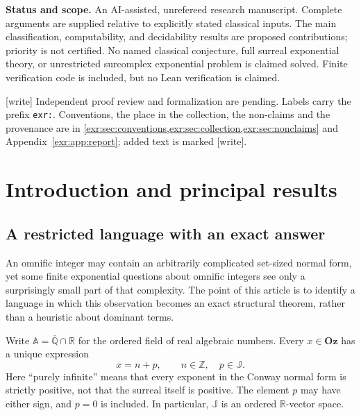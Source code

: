 \documentclass[11pt,letterpaper]{article}
\numberwithin{equation}{section}
\theoremstyle{definition}
\theoremstyle{remark}
\newcommand{\Oz}{\mathbf{Oz}}
\newcommand{\Z}{\mathbb Z}
\newcommand{\R}{\mathbb R}
\newcommand{\A}{\mathbb A}
\newcommand{\Qb}{\overline{\mathbb Q}}
\newcommand{\J}{\mathbb J}
\newcommand{\wtag}{\textup{[write]}}%
\begin{document}
\begin{titlepage}
\begin{minipage}{0.92\textwidth}
\begin{abstract}
We also prove a rectangular normal form for definable sets, finite-image results
for maps between the two components, and an undecidability boundary obtained by
adjoining the single nonlinear relation $\exp(xy)=\exp(z)$. Additional results
classify certain exponential equations with arbitrary positive real bases by
ordinary integer fibers and purely infinite linear families. With just one
irrational scalar-graph predicate, we prove that the theory has exactly the Turing
degree of the rational cut of its slope.
\end{abstract}
\end{minipage}
\vfill
\begin{minipage}{0.92\textwidth}\small
\textbf{Status and scope.} An AI-assisted, unrefereed research manuscript. Complete
arguments are supplied relative to explicitly stated classical inputs. The main
classification, computability, and decidability results are proposed contributions; priority is
not certified. No named classical conjecture, full surreal exponential theory,
or unrestricted surcomplex exponential problem is claimed solved. Finite
verification code is included, but no Lean verification is claimed.

\wtag{} Independent proof review and formalization are pending. Labels
carry the prefix \texttt{exr:}. Conventions, the place in the collection,
the non-claims and the provenance are in
\cref{exr:sec:conventions,exr:sec:collection,exr:sec:nonclaims} and
Appendix~\ref{exr:app:report}; added text is marked \wtag.
\end{minipage}
\end{titlepage}
\hypersetup{pageanchor=true}
\tableofcontents
\clearpage
\section{Introduction and principal results}\label{exr:sec:intro}
\subsection{A restricted language with an exact answer}
An omnific integer may contain an arbitrarily complicated set-sized normal form,
yet some finite exponential questions about omnific integers see only a surprisingly
small part of that complexity. The point of this article is to identify a language
in which this observation becomes an exact structural theorem, rather than a
heuristic about dominant terms.

Write $\A=\Qb\cap\R$ for the ordered field of real algebraic numbers. Every
$x\in\Oz$ has a unique expression
\begin{equation}\label{exr:eq:introsplit}
 x=n+p,\qquad n\in\Z,\quad p\in\J.
\end{equation}
Here ``purely infinite'' means that every exponent in the Conway normal form is
strictly positive, not that the surreal itself is positive. The element $p$ may
have either sign, and $p=0$ is included. In particular, $\J$ is an ordered
$\R$-vector space.
\end{document}
